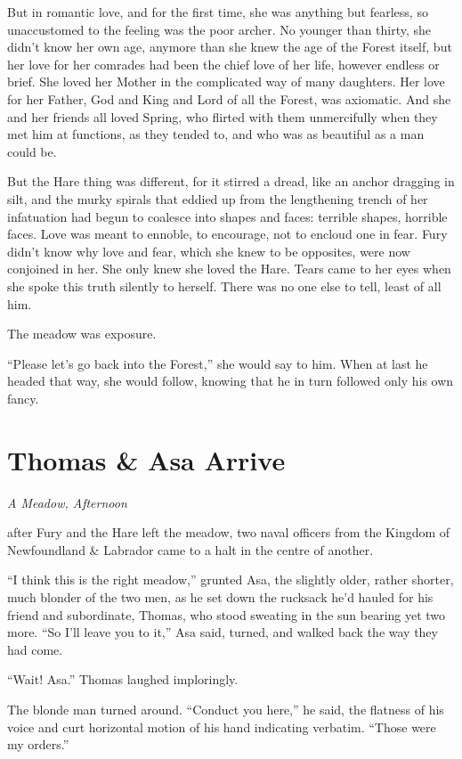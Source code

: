 \documentclass[11pt,a5paper]{article}
\newcommand{\alet}[1]{\textit{#1}\vspace{1em}}
\begin{document}
But in romantic love, and for the first time, she was anything but fearless, so unaccustomed to the feeling was the poor archer. No younger than thirty, she didn't know her own age, anymore than she knew the age of the Forest itself, but her love for her comrades had been the chief love of her life, however endless or brief. She loved her Mother in the complicated way of many daughters. Her love for her Father, God and King and Lord of all the Forest, was axiomatic. And she and her friends all loved Spring, who flirted with them unmercifully when they met him at functions, as they tended to, and who was as beautiful as a man could be.

But the Hare thing was different, for it stirred a dread, like an anchor dragging in silt, and the murky spirals that eddied up from the lengthening trench of her infatuation had begun to coalesce into shapes and faces: terrible shapes, horrible faces. Love was meant to ennoble, to encourage, not to encloud one in fear. Fury didn't know why love and fear, which she knew to be opposites, were now conjoined in her. She only knew she loved the Hare. Tears came to her eyes when she spoke this truth silently to herself. There was no one else to tell, least of all him.

The meadow was exposure.

``Please let's go back into the Forest,'' she would say to him. When at last he headed that way, she would follow, knowing that he in turn followed only his own fancy.

\newpage

\section{Thomas \& Asa Arrive}

\alet{A Meadow, Afternoon}

 after Fury and the Hare left the meadow, two naval officers from the Kingdom of Newfoundland \& Labrador came to a halt in the centre of another.

``I think this is the right meadow,'' grunted Asa, the slightly older, rather shorter, much blonder of the two men, as he set down the rucksack he'd hauled for his friend and subordinate, Thomas, who stood sweating in the sun bearing yet two more. ``So I'll leave you to it,'' Asa said, turned, and walked back the way they had come.

``Wait! Asa.'' Thomas laughed imploringly.

The blonde man turned around. ``Conduct you here,'' he said, the flatness of his voice and curt horizontal motion of his hand indicating verbatim. ``Those were my orders.''
\end{document}
